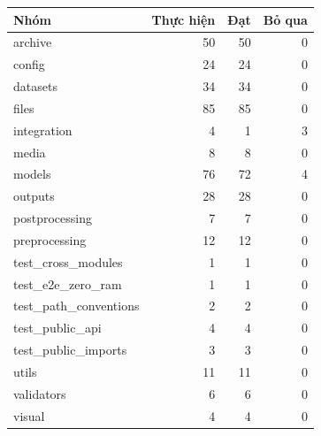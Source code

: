 \begin{tabular}{lrrr}
\toprule
Nhóm & Thực hiện & Đạt & Bỏ qua \\
\midrule
archive & 50 & 50 & 0 \\
config & 24 & 24 & 0 \\
datasets & 34 & 34 & 0 \\
files & 85 & 85 & 0 \\
integration & 4 & 1 & 3 \\
media & 8 & 8 & 0 \\
models & 76 & 72 & 4 \\
outputs & 28 & 28 & 0 \\
postprocessing & 7 & 7 & 0 \\
preprocessing & 12 & 12 & 0 \\
test\_cross\_modules & 1 & 1 & 0 \\
test\_e2e\_zero\_ram & 1 & 1 & 0 \\
test\_path\_conventions & 2 & 2 & 0 \\
test\_public\_api & 4 & 4 & 0 \\
test\_public\_imports & 3 & 3 & 0 \\
utils & 11 & 11 & 0 \\
validators & 6 & 6 & 0 \\
visual & 4 & 4 & 0 \\
\bottomrule
\end{tabular}
